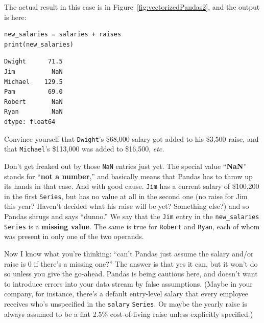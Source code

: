 The actual result in this case is in Figure~\ref{fig:vectorizedPandas2}, and
the output is here:


\begin{Verbatim}[fontsize=\small,samepage=true,frame=single,framesep=3mm]
new_salaries = salaries + raises
print(new_salaries)
\end{Verbatim}

\begin{Verbatim}[fontsize=\small,samepage=true,frame=leftline,framesep=5mm,framerule=1mm]
Dwight      71.5
Jim          NaN
Michael    129.5
Pam         69.0
Robert       NaN
Ryan         NaN
dtype: float64
\end{Verbatim}


Convince yourself that \texttt{Dwight}'s \$68,000 salary got added to his
\$3,500 raise, and that \texttt{Michael}'s \$113,000 was added to \$16,500,
\textit{etc.}

\label{NaN}

Don't get freaked out by those \texttt{NaN} entries just yet. The special value
``\textbf{NaN}'' stands for ``\textbf{not a number},'' and basically means that
Pandas has to throw up its hands in that case. And with good cause.
\texttt{Jim} has a current salary of \$100,200 in the first \texttt{Series},
but has no value at all in the second one (no raise for Jim this year? Haven't
decided what his raise will be yet? Something else?) and so Pandas shrugs and
says ``dunno.'' We say that the \texttt{Jim} entry in the
\texttt{new\_salaries} \texttt{Series} is a \textbf{missing value}. The same is
true for \texttt{Robert} and \texttt{Ryan}, each of whom was present in only
one of the two operands.

Now I know what you're thinking: ``can't Pandas just assume the salary and/or
raise is 0 if there's a missing one?'' The answer is that yes it can, but it
won't do so unless you give the go-ahead. Pandas is being cautious here, and
doesn't want to introduce errors into your data stream by false assumptions.
(Maybe in your company, for instance, there's a default entry-level salary that
every employee receives who's unspecified in the \texttt{salary}
\texttt{Series}. Or maybe the yearly raise is always assumed to be a flat 2.5\%
cost-of-living raise unless explicitly specified.)

